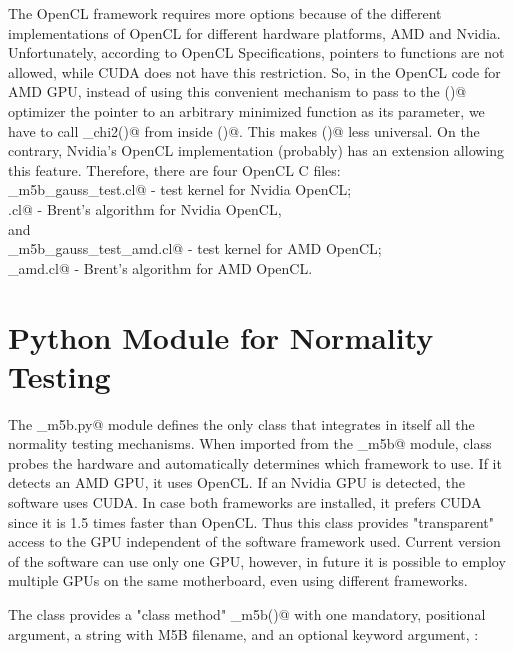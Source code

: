 \documentclass[letterpaper,twoside,12pt]{article}
\newcommand{\midtilde}{\raisebox{0.5ex}{\texttildelow}}
\begin{document}
The OpenCL framework requires more options because of the different implementations of OpenCL for different hardware platforms, AMD and Nvidia. Unfortunately, according to OpenCL Specifications, pointers to functions are not allowed, while CUDA does not have this restriction. So, in the OpenCL code for AMD GPU, instead of using this convenient mechanism to pass to the \verb@fminbndf()@ optimizer the pointer to an arbitrary minimized function as its parameter, we have to call \verb@calc_chi2()@ from inside \verb@fminbndf()@. This makes \verb@fminbndf()@ less universal. On the contrary, Nvidia's OpenCL implementation (probably) has an extension allowing this feature. Therefore, there are four OpenCL C files: \\

\noindent \verb@ker_m5b_gauss_test.cl@ - test kernel for Nvidia OpenCL; \\
\noindent \verb@fminbndf.cl@ - Brent's algorithm for Nvidia OpenCL, \\

\noindent and \\

\noindent \verb@ker_m5b_gauss_test_amd.cl@ - test kernel for AMD OpenCL; \\
\noindent \verb@fminbndf_amd.cl@ - Brent's algorithm for AMD OpenCL. \\



\section{Python Module for Normality Testing}

The \verb@gpu_m5b.py@ module defines the only class \verb@Normtest@ that integrates in itself all the normality testing mechanisms. When imported from the \verb@gpu_m5b@ module, \verb@Normtest@ class probes the hardware and automatically determines which framework to use. If it detects an AMD GPU, it uses OpenCL. If an Nvidia GPU is detected, the software uses CUDA. In case both frameworks are installed, it prefers CUDA since it is \midtilde 1.5  times faster than OpenCL. Thus this class provides "transparent" access to the GPU independent of the software framework used. Current version of the software can use only one GPU, however, in future it is possible to employ multiple GPUs on the same motherboard, even using different frameworks. 

The \verb@Normtest@ class provides a "class method" \verb@do_m5b()@ with one mandatory, positional argument, a string with M5B filename, and an optional keyword argument, \verb@nthreads@: \\
\end{document}
